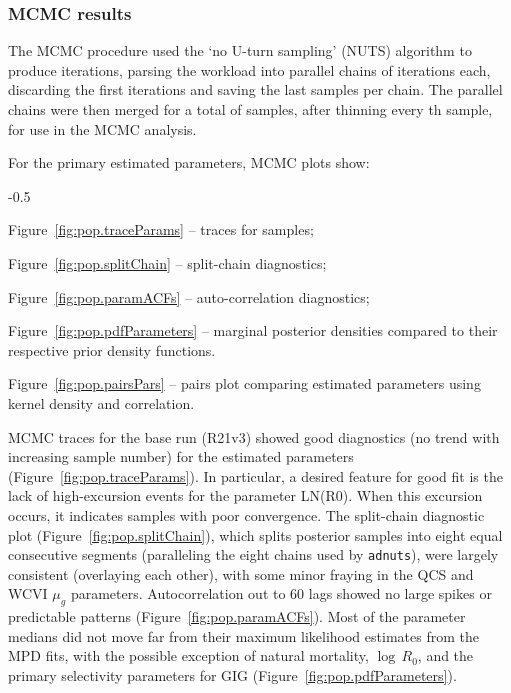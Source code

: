 \documentclass[11pt]{book}
\newcommand{\code}[1]{\texttt{#1}}
\begin{document}
\subsubsection{MCMC results}\label{sss:MCMC}


The MCMC procedure used the `no U-turn sampling' (NUTS) algorithm \citep{Monnahan-Kristensen:2018, Monnahan-etal:2019} to produce \nSimsBase{} iterations, parsing the workload into \nChains{} parallel chains \citep{R:2015_snowfall} of \cSimsBase{} iterations each, discarding the first \cBurnBase{} iterations and saving the last \cSampBase{} samples per chain.
The parallel chains were then merged for a total of \Nmcmc{} samples, after thinning every \nThinBase{}th sample, for use in the MCMC analysis.

For the primary estimated parameters, MCMC plots show:
\begin{itemize_csas}{-0.5}{}
\item Figure~\ref{fig:pop.traceParams} -- traces for \Nmcmc{} samples;
\item Figure~\ref{fig:pop.splitChain} -- split-chain diagnostics;
\item Figure~\ref{fig:pop.paramACFs} -- auto-correlation diagnostics;
\item Figure~\ref{fig:pop.pdfParameters} -- marginal posterior densities compared to their respective prior density functions.
\item Figure~\ref{fig:pop.pairsPars} -- pairs plot comparing estimated parameters using kernel density and correlation.
\end{itemize_csas}

MCMC traces for the base run (R21v3) showed good diagnostics (no trend with increasing sample number) for the estimated parameters (Figure~\ref{fig:pop.traceParams}).
In particular, a desired feature for good fit is the lack of high-excursion events for the parameter LN(R0).
When this excursion occurs, it indicates samples with poor convergence.
The split-chain diagnostic plot (Figure~\ref{fig:pop.splitChain}), which splits posterior samples into eight equal consecutive segments (paralleling the eight chains used by \code{adnuts}), were largely consistent (overlaying each other), with some minor fraying in the QCS and WCVI $\mu_g$ parameters.
Autocorrelation out to 60 lags showed no large spikes or predictable patterns (Figure~\ref{fig:pop.paramACFs}).
Most of the parameter medians did not move far from their maximum likelihood estimates from the MPD fits, with the possible exception of natural mortality, $\log\,R_0$, and the primary selectivity parameters for GIG (Figure~\ref{fig:pop.pdfParameters}).
\end{document}
